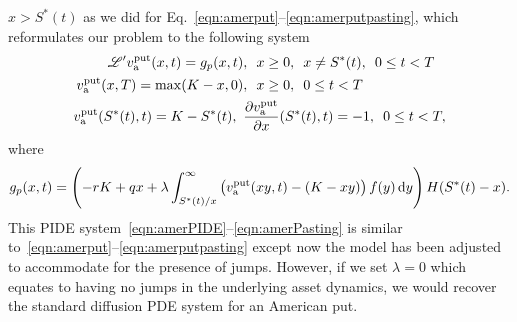     $x > S^*(t)$ as we did for Eq.~\eqref{eqn:amerput}--\eqref{eqn:amerputpasting}, which reformulates our problem to the following system
      \begin{align}
          \label{eqn:amerPIDE}
          \mathscr L'v_{\text{a}}^{\text{put}}(x,t) = g_p(x,t)&, \enskip x \geq 0, \enskip x \neq S^*(t), \enskip 0 \leq t < T \\
          \label{eqn:amerPut}
          v_{\text{a}}^{\text{put}}(x,T) =  \max(K - x,0) &, \enskip x \geq 0, \enskip 0 \leq t < T \\
          \label{eqn:amerPasting}
          v_{\text{a}}^{\text{put}}(S^*(t),t) = K - S^*(t), \enskip &\frac{\partial v_{\text{a}}^{\text{put}}}{\partial x}(S^*(t),t) = -1, \enskip 0 \leq t < T,
      \end{align}
    where
      \begin{equation}
        \label{eqn:g}
        g_p(x,t) = \left(-rK + qx + \lambda \int_{S^*(t)/x}^\infty \left(v_{\text{a}}^{\text{put}}(xy,t) - (K-xy)\right)f(y) \,\mathrm d y \right)H(S^*(t)-x).
      \end{equation}
This PIDE system~\eqref{eqn:amerPIDE}--\eqref{eqn:amerPasting} is similar to~\eqref{eqn:amerput}--\eqref{eqn:amerputpasting} except now the model has been adjusted to accommodate for the presence of jumps. However, if we set $\lambda = 0$ which equates to having no jumps in the underlying asset dynamics, we would recover the standard diffusion PDE system for an American put.

